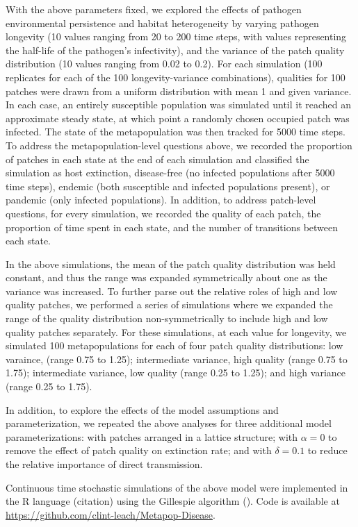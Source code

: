 \documentclass{svjour3}
\begin{document}
With the above parameters fixed, we explored the effects of pathogen environmental persistence and habitat heterogeneity by varying pathogen longevity (10 values ranging from 20 to 200 time steps, with values representing the half-life of the pathogen's infectivity), and the variance of the patch quality distribution (10 values ranging from 0.02 to 0.2).  For each simulation (100 replicates for each of the 100 longevity-variance combinations), qualities for 100 patches were drawn from a uniform distribution with mean 1 and given variance. In each case, an entirely susceptible population was simulated until it reached an approximate steady state, at which point a randomly chosen occupied patch was infected.  The state of the metapopulation was then tracked for 5000 time steps.  To address the metapopulation-level questions above, we recorded the proportion of patches in each state at the end of each simulation and classified the simulation as host extinction, disease-free (no infected populations after 5000 time steps), endemic (both susceptible and infected populations present), or pandemic (only infected populations).  In addition, to address patch-level questions, for every simulation, we recorded the quality of each patch, the proportion of time spent in each state, and the number of transitions between each state.  

In the above simulations, the mean of the patch quality distribution was held constant, and thus the range was expanded symmetrically about one as the variance was increased.  To further parse out the relative roles of high and low quality patches, we performed a series of simulations where we expanded the range of the quality distribution non-symmetrically to include high and low quality patches separately.  For these simulations, at each value for longevity, we simulated 100 metapopulations for each of four patch quality distributions: low varaince, (range 0.75 to 1.25); intermediate variance, high quality (range 0.75 to 1.75); intermediate variance, low quality (range 0.25 to 1.25); and high variance (range 0.25 to 1.75).

In addition, to explore the effects of the model assumptions and parameterization, we repeated the above analyses for three additional model parameterizations: with patches arranged in a lattice structure; with $\alpha = 0$ to remove the effect of patch quality on extinction rate; and with $\delta = 0.1$ to reduce the relative importance of direct transmission. 

Continuous time stochastic simulations of the above model were implemented in the R language (citation) using the Gillespie algorithm (\cite{Gillespie1977}).  Code is available at \url{https://github.com/clint-leach/Metapop-Disease}.
\end{document}
